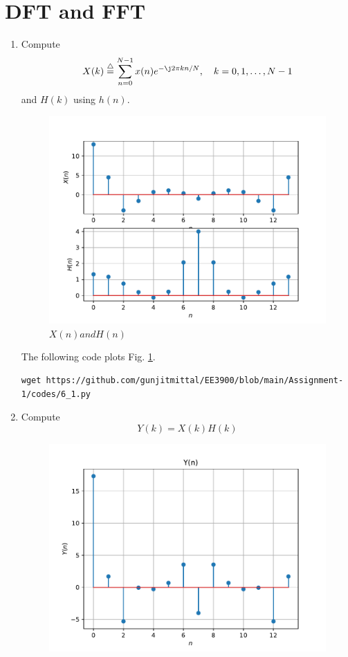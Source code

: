 \documentclass[journal,12pt,twocolumn]{IEEEtran}
\renewcommand\thesection{\arabic{section}}
\begin{document}
\section{DFT and FFT}
\begin{enumerate}[label=\thesection.\arabic*]
\item
Compute
\begin{equation}
X(k) \define \sum _{n=0}^{N-1}x(n) e^{-\j2\pi kn/N}, \quad k = 0,1,\dots, N-1
\end{equation}
and $H(k)$ using $h(n)$.\\
\solution 
\begin{figure}[!ht]
  \centering
  \includegraphics[width=\columnwidth]{./figs/X-H(n).pdf}
  \caption{$X(n) and H(n)$}
  \label{fig:X-H(n)}
  \end{figure}
  The following code plots Fig. \ref{fig:X-H(n)}.
%
\begin{lstlisting}
wget https://github.com/gunjitmittal/EE3900/blob/main/Assignment-1/codes/6_1.py
\end{lstlisting}
\item Compute 
\begin{equation}
Y(k) = X(k)H(k)
\label{eq:fp}
\end{equation}
\solution 
\begin{figure}[!ht]
  \centering
  \includegraphics[width=\columnwidth]{./figs/Y(n).pdf}

\end{figure}
\end{enumerate}
\end{document}
